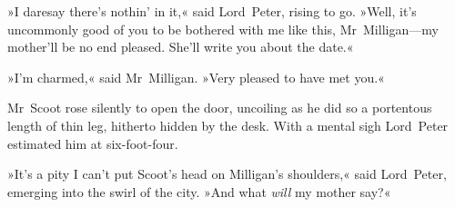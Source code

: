 »I daresay there's nothin' in it,« said Lord~Peter, rising to go. »Well, it's uncommonly good of you to be bothered with me like this, Mr~Milligan—my mother'll be no end pleased. She'll write you about the date.«

»I'm charmed,« said Mr~Milligan. »Very pleased to have met you.«

Mr~Scoot rose silently to open the door, uncoiling as he did so a portentous length of thin leg, hitherto hidden by the desk. With a mental sigh Lord~Peter estimated him at six-foot-four.

»It's a pity I can't put Scoot's head on Milligan's shoulders,« said Lord~Peter, emerging into the swirl of the city. »And what \textit{will} my mother say?«